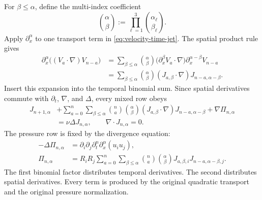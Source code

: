 For \(\beta\le\alpha\), define the multi-index coefficient
\begin{equation*}
 \binom{\alpha}{\beta}
 :=\prod_{\ell=1}^3
   \binom{\alpha_\ell}{\beta_\ell}.
\end{equation*}
Apply \(\partial_x^\alpha\) to one transport term in
\eqref{eq:velocity-time-jet}.  The spatial product rule gives
\begin{align*}
 \partial_x^\alpha
 \bigl((V_a\cdot\nabla)V_{n-a}\bigr)
 &=\sum_{\beta\le\alpha}
   \binom{\alpha}{\beta}
   \bigl(\partial_x^\beta V_a\cdot\nabla\bigr)
   \partial_x^{\alpha-\beta}V_{n-a}
 \\
 &=\sum_{\beta\le\alpha}
   \binom{\alpha}{\beta}
   (J_{a,\beta}\cdot\nabla)
   J_{n-a,\alpha-\beta}.
\end{align*}
Insert this expansion into the temporal binomial sum.  Since spatial
derivatives commute with \(\partial_t\), \(\nabla\), and \(\Delta\), every
mixed row obeys
\begin{equation}
\begin{aligned}
 J_{n+1,\alpha}
 &+\sum_{a=0}^n\sum_{\beta\le\alpha}
 \binom na\binom{\alpha}{\beta}
 (J_{a,\beta}\cdot\nabla)
 J_{n-a,\alpha-\beta}
 +\nabla\Pi_{n,\alpha}
 \\
 &=\nu\Delta J_{n,\alpha},
 \qquad
 \nabla\cdot J_{n,\alpha}=0.
\end{aligned}
\label{eq:mixed-jet}
\end{equation}
The pressure row is fixed by the divergence equation:
\begin{equation}
\begin{aligned}
 -\Delta\Pi_{n,\alpha}
 &=\partial_i\partial_j
   \partial_t^n\partial_x^\alpha(u_i u_j),
 \\
 \Pi_{n,\alpha}
 &=R_iR_j
 \sum_{a=0}^n\sum_{\beta\le\alpha}
 \binom na\binom{\alpha}{\beta}
 J_{a,\beta,i}J_{n-a,\alpha-\beta,j}.
\end{aligned}
\label{eq:mixed-pressure}
\end{equation}
The first binomial factor distributes temporal derivatives.  The second
distributes spatial derivatives.  Every term is produced by the original
quadratic transport and the original pressure normalization.

